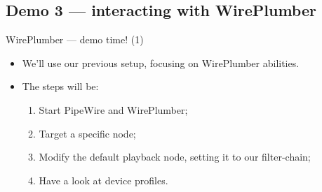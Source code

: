 


\subsection{Demo 3 — interacting with WirePlumber}



\begin{frame}{WirePlumber — demo time! (1)}
  \begin{itemize}

  \item We'll use our previous setup, focusing on WirePlumber abilities.

  \item The steps will be:

    \begin{enumerate}
    \item Start PipeWire and WirePlumber;
    \item Target a specific node;
    \item Modify the default playback node, setting it to our filter-chain;
    \item Have a look at device profiles.
    \end{enumerate}

  \end{itemize}
\end{frame}



